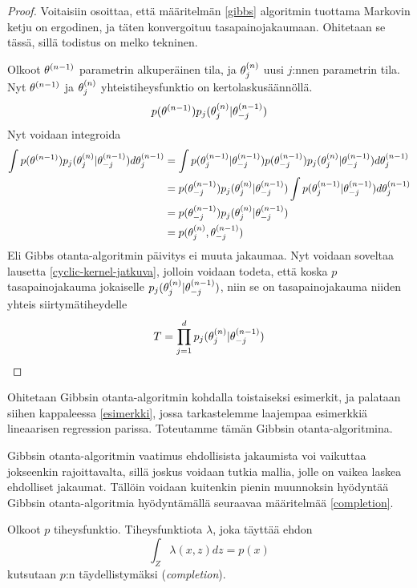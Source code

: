 \begin{proof}
	Voitaisiin osoittaa, että määritelmän \ref{gibbs} algoritmin tuottama Markovin ketju on ergodinen, ja täten konvergoituu tasapainojakaumaan. Ohitetaan se tässä, sillä todistus on melko tekninen.
	
	Olkoot $\theta^{(n-1)}$ parametrin alkuperäinen tila, ja $\theta^{(n)}_j$ uusi $j$:nnen parametrin tila. Nyt $\theta^{(n-1)}$ ja $\theta^{(n)}_j$ yhteistiheysfunktio on kertolaskusäännöllä.
	\begin{equation}
		p(\theta^{(n-1)})p_j(\theta^{(n)}_j|\theta^{(n-1)}_{-j})
	\end{equation}
	Nyt voidaan integroida
	\begin{equation}
		\begin{split}
			\int p(\theta^{(n-1)})p_j(\theta^{(n)}_j|\theta^{(n-1)}_{-j}) d\theta^{(n-1)}_j &= \int p(\theta^{(n-1)}_j|\theta^{(n-1)}_{-j})p(\theta^{(n-1)}_{-j})p_j(\theta^{(n)}_j|\theta^{(n-1)}_{-j}) d\theta^{(n-1)}_j \\
			&= p(\theta^{(n-1)}_{-j})p_j(\theta^{(n)}_j|\theta^{(n-1)}_{-j}) \int p(\theta^{(n-1)}_j|\theta^{(n-1)}_{-j}) d\theta^{(n-1)}_j \\
			&= p(\theta^{(n-1)}_{-j})p_j(\theta^{(n)}_j|\theta^{(n-1)}_{-j}) \\
			&= p(\theta^{(n)}_j,\theta^{(n-1)}_{-j})
		\end{split}
	\end{equation}
	Eli Gibbs otanta-algoritmin päivitys ei muuta jakaumaa. Nyt voidaan soveltaa lausetta \ref{cyclic-kernel-jatkuva}, jolloin voidaan todeta, että koska $p$ tasapainojakauma jokaiselle $p_j(\theta^{(n)}_j|\theta^{(n-1)}_{-j})$, niin se on tasapainojakauma niiden yhteis siirtymätiheydelle
	\begin{equation}
		T = \prod_{j=1}^{d} p_j(\theta^{(n)}_j|\theta^{(n-1)}_{-j})
	\end{equation}

\end{proof}

Ohitetaan Gibbsin otanta-algoritmin kohdalla toistaiseksi esimerkit, ja palataan siihen kappaleessa \ref{esimerkki}, jossa tarkastelemme laajempaa esimerkkiä lineaarisen regression parissa. Toteutamme tämän Gibbsin otanta-algoritmina.

Gibbsin otanta-algoritmin vaatimus ehdollisista jakaumista voi vaikuttaa jokseenkin rajoittavalta, sillä joskus voidaan tutkia mallia, jolle on vaikea laskea ehdolliset jakaumat. Tällöin voidaan kuitenkin pienin muunnoksin hyödyntää Gibbsin otanta-algoritmia hyödyntämällä seuraavaa määritelmää \ref{completion}. \cite[s.~374]{monte_carlo_book} 

\begin{maar}\label{completion}
	Olkoot $p$ tiheysfunktio. Tiheysfunktiota $\lambda$, joka täyttää ehdon
	\begin{equation}
		\int_Z \lambda(x,z) dz = p(x)
	\end{equation}
	kutsutaan $p$:n täydellistymäksi (\textit{completion}).
\end{maar}

